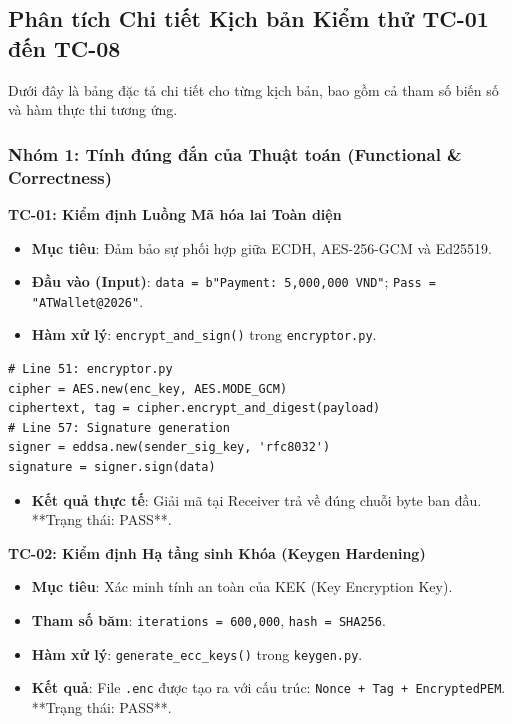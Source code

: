 \documentclass[11pt,a4paper]{article}
\begin{document}
\subsection{Phân tích Chi tiết Kịch bản Kiểm thử TC-01 đến TC-08}
Dưới đây là bảng đặc tả chi tiết cho từng kịch bản, bao gồm cả tham số biến số và hàm thực thi tương ứng.

\subsubsection{Nhóm 1: Tính đúng đắn của Thuật toán (Functional \& Correctness)}

\textbf{TC-01: Kiểm định Luồng Mã hóa lai Toàn diện}
\begin{itemize}[noitemsep]
    \item \textbf{Mục tiêu}: Đảm bảo sự phối hợp giữa ECDH, AES-256-GCM và Ed25519.
    \item \textbf{Đầu vào (Input)}: \texttt{data = b"Payment: 5,000,000 VND"}; \texttt{Pass = "ATWallet@2026"}.
    \item \textbf{Hàm xử lý}: \texttt{encrypt\_and\_sign()} trong \texttt{encryptor.py}.
\end{itemize}
\begin{lstlisting}
# Line 51: encryptor.py
cipher = AES.new(enc_key, AES.MODE_GCM)
ciphertext, tag = cipher.encrypt_and_digest(payload)
# Line 57: Signature generation
signer = eddsa.new(sender_sig_key, 'rfc8032')
signature = signer.sign(data)
\end{lstlisting}
\begin{itemize}
    \item \textbf{Kết quả thực tế}: Giải mã tại Receiver trả về đúng chuỗi byte ban đầu. **Trạng thái: PASS**.
\end{itemize}

\textbf{TC-02: Kiểm định Hạ tầng sinh Khóa (Keygen Hardening)}
\begin{itemize}[noitemsep]
    \item \textbf{Mục tiêu}: Xác minh tính an toàn của KEK (Key Encryption Key).
    \item \textbf{Tham số băm}: \texttt{iterations = 600,000}, \texttt{hash = SHA256}.
    \item \textbf{Hàm xử lý}: \texttt{generate\_ecc\_keys()} trong \texttt{keygen.py}.
    \item \textbf{Kết quả}: File \texttt{.enc} được tạo ra với cấu trúc: \texttt{Nonce + Tag + EncryptedPEM}. **Trạng thái: PASS**.
\end{itemize}
\end{document}
